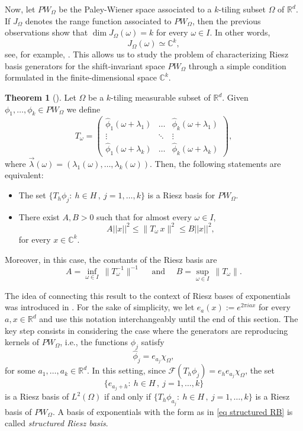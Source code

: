 \documentclass[a4paper,11pt]{amsart}
\theoremstyle{definition}
\newtheorem{teo}[fed]{Theorem}
\theoremstyle{definition}
\def\la{\lambda}
\def\w{\omega}
\def\W{\Omega}
\def\R{\mathbb{R}}
\def\C{\mathbb{C}}
\newcommand{\peso}[1]{ \quad \mbox{  #1 } \quad }
\begin{document}
Now, let $PW_\Omega$ be the Paley-Wiener space associated to a $k$-tiling subset $\Omega$ of $\R^d$. If $J_\Omega$ denotes the range function associated to $PW_\Omega$,  then the previous observations show that $\dim J_\W(\w)=k$ for every $\w\in I$. In other words, 
\begin{equation*}
	J_\Omega(\w)\simeq\C^k,
\end{equation*}
see, for example, \cite[Proposition 2.12]{CC}. This allows us to study the problem of characterizing Riesz basis generators for the shift-invariant space $PW_\Omega$ through a simple condition formulated in the finite-dimensional space $\C^k$.

\begin{teo}[{\cite[Theorem 2.13]{AAC}}]\label{ShiftBFR0}
	Let $\Omega$ be a $k$-tiling measurable subset of $\R^d$. Given $\phi_1,\ldots,\phi_k \in PW_\Omega$ we define
	$$
	T_\w=\begin{pmatrix}
		\widehat{\phi}_1(\w+\la_{1})&\ldots& \widehat{\phi}_k(\w+\la_{1})\\
		\vdots&\ddots&\vdots\\
		\widehat{\phi}_1(\w+\la_{k})&\ldots& \widehat{\phi}_k(\w+\la_{k})
	\end{pmatrix},
	$$ 
	where $\vec{\la}(\w) = (\la_1(\w), \dots, \la_k(\w))$. Then, the following  statements are equivalent:
	
	\begin{itemize}
		\item[i)] The set $\{T_h\phi_j:\ h\in H\,,\ j=1,\ldots,k\}$ is a Riesz basis for $PW_\Omega$.
		\item[ii)]  There exist $A, B>0$ such that for almost every $\omega \in I$,
		\begin{equation}\label{item-2}
			A||x||^2 \leq \|T_\w \,x\|^2\leq B||x||^2,
		\end{equation}
		for every $x\in \C^k$.
	\end{itemize}
	Moreover, in this case, the constants of the Riesz basis are 
	$$
	A=\inf_{\w\in I} \ \|T_\w^{-1}\|^{-1} \peso{and} B=\sup_{\w\in I}\ \|T_\w\|.
	$$
\end{teo}


The idea of connecting this result to the context of Riesz bases of exponentials was introduced in \cite{AAC}. For the sake of simplicity, we let $e_a(x):=e^{2\pi i a  x}$ for every $a,x\in\R^d$ and use this notation interchangeably until the end of this section. The key step consists in considering the case where the generators are reproducing kernels of $PW_\Omega$, i.e., the functions $\phi_j$ satisfy
$$\hat{\phi}_{j} = e_{a_j}\chi_\Omega,$$
for some $a_1,\dots,a_k\in \R^d$. In this setting, since $\mathcal{F} (T_h\phi_{j}) = e_he_{a_j}\chi_\Omega$, the set 
\begin{equation}\label{eq structured RB}
	\{e_{a_j +h}:\ h\in H\,,\ j=1,\ldots,k\}
\end{equation}
is a Riesz basis of $L^2(\Omega)$ if and only if  $\{T_h\phi_{a_j}:\ h\in H\,,\ j=1,\ldots,k\}$ is a Riesz basis of  $PW_\Omega$. A basis of exponentials with the form as in \eqref{eq structured RB} is called  \textit{structured Riesz basis}.
\end{document}
